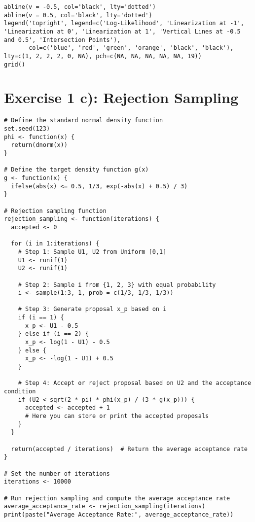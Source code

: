\begin{tcolorbox}[colback=white!95!black,colframe=white!50!black, breakable]
\begin{lstlisting}[caption={Exercise 1b}, label={lst:boundary_func}]
abline(v = -0.5, col='black', lty='dotted')
abline(v = 0.5, col='black', lty='dotted')
legend('topright', legend=c('Log-Likelihood', 'Linearization at -1', 'Linearization at 0', 'Linearization at 1', 'Vertical Lines at -0.5 and 0.5', 'Intersection Points'),
       col=c('blue', 'red', 'green', 'orange', 'black', 'black'), lty=c(1, 2, 2, 2, 0, NA), pch=c(NA, NA, NA, NA, NA, 19))
grid()
\end{lstlisting}
\end{tcolorbox}
\vspace{15mm}
\section*{Exercise 1 c): Rejection Sampling}
\begin{tcolorbox}[colback=white!95!black,colframe=white!50!black, breakable]
\begin{lstlisting}[caption={Exercise 1c}, label={lst:rejection}]
# Define the standard normal density function
set.seed(123)
phi <- function(x) {
  return(dnorm(x))
}

# Define the target density function g(x)
g <- function(x) {
  ifelse(abs(x) <= 0.5, 1/3, exp(-abs(x) + 0.5) / 3)
}

# Rejection sampling function
rejection_sampling <- function(iterations) {
  accepted <- 0
  
  for (i in 1:iterations) {
    # Step 1: Sample U1, U2 from Uniform [0,1]
    U1 <- runif(1)
    U2 <- runif(1)
    
    # Step 2: Sample i from {1, 2, 3} with equal probability
    i <- sample(1:3, 1, prob = c(1/3, 1/3, 1/3))
    
    # Step 3: Generate proposal x_p based on i
    if (i == 1) {
      x_p <- U1 - 0.5
    } else if (i == 2) {
      x_p <- log(1 - U1) - 0.5
    } else {
      x_p <- -log(1 - U1) + 0.5
    }
    
    # Step 4: Accept or reject proposal based on U2 and the acceptance condition
    if (U2 < sqrt(2 * pi) * phi(x_p) / (3 * g(x_p))) {
      accepted <- accepted + 1
      # Here you can store or print the accepted proposals
    }
  }
  
  return(accepted / iterations)  # Return the average acceptance rate
}

# Set the number of iterations
iterations <- 10000

# Run rejection sampling and compute the average acceptance rate
average_acceptance_rate <- rejection_sampling(iterations)
print(paste("Average Acceptance Rate:", average_acceptance_rate))
\end{lstlisting}
\end{tcolorbox}
\vspace{30mm}
